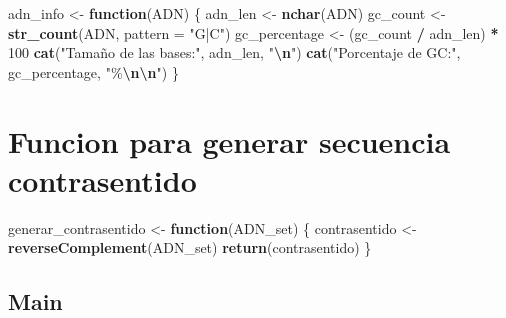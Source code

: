 \documentclass[
]{article}
\newenvironment{Shaded}{\begin{snugshade}}{\end{snugshade}}
\newcommand{\AttributeTok}[1]{\textcolor[rgb]{0.13,0.29,0.53}{#1}}
\newcommand{\ControlFlowTok}[1]{\textcolor[rgb]{0.13,0.29,0.53}{\textbf{#1}}}
\newcommand{\DecValTok}[1]{\textcolor[rgb]{0.00,0.00,0.81}{#1}}
\newcommand{\FunctionTok}[1]{\textcolor[rgb]{0.13,0.29,0.53}{\textbf{#1}}}
\newcommand{\NormalTok}[1]{#1}
\newcommand{\OtherTok}[1]{\textcolor[rgb]{0.56,0.35,0.01}{#1}}
\newcommand{\SpecialCharTok}[1]{\textcolor[rgb]{0.81,0.36,0.00}{\textbf{#1}}}
\newcommand{\StringTok}[1]{\textcolor[rgb]{0.31,0.60,0.02}{#1}}
\begin{document}
\begin{Shaded}
\begin{Highlighting}[]
\NormalTok{adn\_info }\OtherTok{\textless{}{-}} \ControlFlowTok{function}\NormalTok{(ADN) \{}
\NormalTok{  adn\_len }\OtherTok{\textless{}{-}} \FunctionTok{nchar}\NormalTok{(ADN)}
\NormalTok{  gc\_count }\OtherTok{\textless{}{-}} \FunctionTok{str\_count}\NormalTok{(ADN, }\AttributeTok{pattern =} \StringTok{"G|C"}\NormalTok{)}
\NormalTok{  gc\_percentage }\OtherTok{\textless{}{-}}\NormalTok{ (gc\_count }\SpecialCharTok{/}\NormalTok{ adn\_len) }\SpecialCharTok{*} \DecValTok{100}
  \FunctionTok{cat}\NormalTok{(}\StringTok{"Tamaño de las bases:"}\NormalTok{, adn\_len, }\StringTok{"}\SpecialCharTok{\textbackslash{}n}\StringTok{"}\NormalTok{)}
  \FunctionTok{cat}\NormalTok{(}\StringTok{"Porcentaje de GC:"}\NormalTok{, gc\_percentage, }\StringTok{"\%}\SpecialCharTok{\textbackslash{}n\textbackslash{}n}\StringTok{"}\NormalTok{)}
\NormalTok{\}}
\end{Highlighting}
\end{Shaded}

\hypertarget{funcion-para-generar-secuencia-contrasentido}{%
\section{Funcion para generar secuencia
contrasentido}\label{funcion-para-generar-secuencia-contrasentido}}

\begin{Shaded}
\begin{Highlighting}[]
\NormalTok{generar\_contrasentido }\OtherTok{\textless{}{-}} \ControlFlowTok{function}\NormalTok{(ADN\_set) \{}
\NormalTok{  contrasentido }\OtherTok{\textless{}{-}} \FunctionTok{reverseComplement}\NormalTok{(ADN\_set)}
  \FunctionTok{return}\NormalTok{(contrasentido)}
\NormalTok{\}}
\end{Highlighting}
\end{Shaded}

\hypertarget{main}{%
\subsection{Main}\label{main}}
\end{document}
